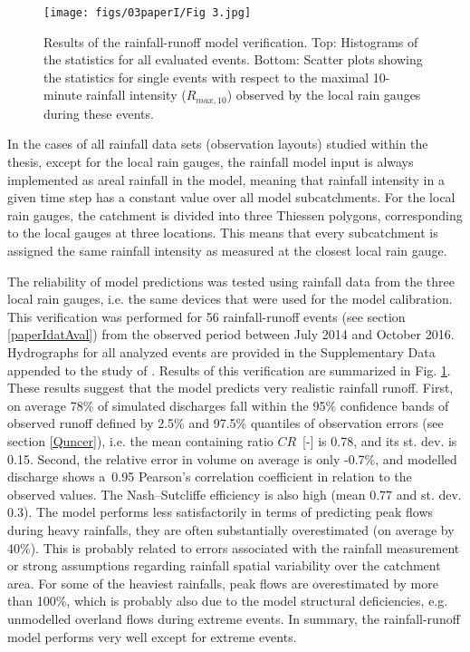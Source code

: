 \documentclass{ctuthesis}\usepackage[]{graphicx}\usepackage[]{color}
\begin{document}
\begin{figure}[h]
\begin{center}
\texttt{[image: figs/03paperI/Fig 3.jpg]}
\caption{Results of the rainfall-runoff model verification. Top: Histograms of the statistics for all evaluated events. Bottom: Scatter plots showing the statistics for single events with respect to the maximal 10-minute rainfall intensity ($R_{max,10}$) observed by the local rain gauges during these events.} \label{3fig3}
\end{center}
\end{figure}

In the cases of all rainfall data sets (observation layouts) studied within the thesis, except for the local rain gauges, the rainfall model input is always implemented as areal rainfall in the model, meaning that rainfall intensity in a given time step has a constant value over all model subcatchments. For the local rain gauges, the catchment is divided into three Thiessen polygons, corresponding to the local gauges at three locations. This means that every subcatchment is assigned the same rainfall intensity as measured at the closest local rain gauge.

The reliability of model predictions was tested using rainfall data from the three local rain gauges, i.e. the same devices that were used for the model calibration. This verification was performed for 56 rainfall-runoff events (see section \ref{paperIdatAval}) from the observed period between July 2014 and October 2016. Hydrographs for all analyzed events are provided in the Supplementary Data appended to the study of \cite{pastorekCommercialMicrowaveLinks2019}. Results of this verification are summarized in Fig. \ref{3fig3}. These results suggest that the model predicts very realistic rainfall runoff. First, on average 78\% of simulated discharges fall within the 95\% confidence bands of observed runoff defined by 2.5\% and 97.5\% quantiles of observation errors (see section \ref{Quncer}), i.e. the mean containing ratio \mbox{$CR$~[-]} is 0.78, and its st. dev. is 0.15. Second, the relative error in volume on average is only -0.7\%, and modelled discharge shows a~0.95 Pearson's correlation coefficient in relation to the observed values. The Nash–Sutcliffe efficiency is also high (mean 0.77 and st. dev. 0.3). The model performs less satisfactorily in terms of predicting peak flows during heavy rainfalls, they are often substantially overestimated (on average by 40\%). This is probably related to errors associated with the rainfall measurement or strong assumptions regarding rainfall spatial variability over the catchment area. For some of the heaviest rainfalls, peak flows are overestimated by more than 100\%, which is probably also due to the model structural deficiencies, e.g. unmodelled overland flows during extreme events. In summary, the rainfall-runoff model performs very well except for extreme events. 
\end{document}
